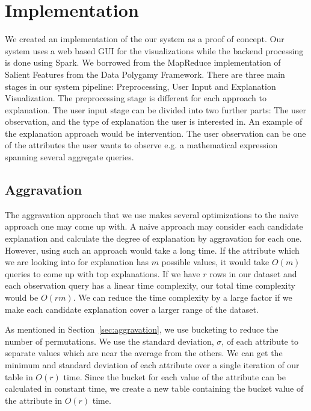 \chapter{Implementation}
\label{sec:implementation}
We created an implementation of the our system as a proof of concept. Our system uses a web based GUI for the visualizations while the backend processing is done using Spark\citep{shanahan2015large}. We borrowed from the MapReduce implementation of Salient Features from the Data Polygamy Framework\citep{chirigati2016data}. There are three main stages in our system pipeline: Preprocessing, User Input and Explanation Visualization. The preprocessing stage is different for each approach to explanation. The user input stage can be divided into two further parts: The user observation, and the type of explanation the user is interested in. An example of the explanation approach would be intervention. The user observation can be one of the attributes the user wants to observe e.g. a mathematical expression spanning several aggregate queries.

\section{Aggravation}
\label{aggravation_impl}
The aggravation approach that we use makes several optimizations to the naive approach one may come up with. A naive approach may consider each candidate explanation and calculate the degree of explanation by aggravation for each one. However, using such an approach would take a long time. If the attribute which we are looking into for explanation has $m$ possible values, it would take $O(m)$ queries to come up with top explanations. If we have $r$ rows in our dataset and each observation query has a linear time complexity, our total time complexity would be $O(rm)$. We can reduce the time complexity by a large factor if we make each candidate explanation cover a larger range of the dataset. 

As mentioned in Section~\ref{sec:aggravation}, we use bucketing to reduce the number of permutations. We use the standard deviation, $\sigma$, of each attribute to separate values which are near the average from the others. We can get the minimum and standard deviation of each attribute over a single iteration of our table in $O(r)$ time. Since the bucket for each value of the attribute can be calculated in constant time, we create a new table containing the bucket value of the attribute in $O(r)$ time. 

